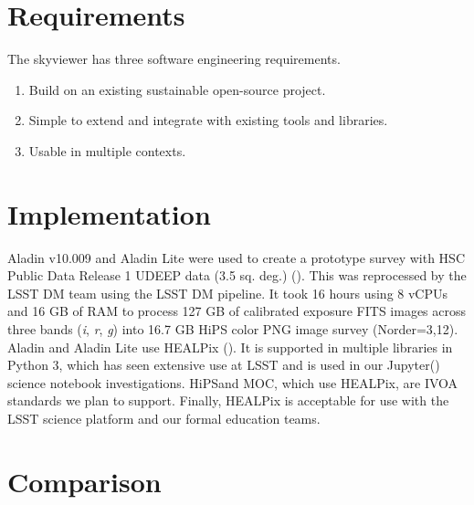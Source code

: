 \documentclass[11pt,twoside]{article}
\begin{document}

\section{Requirements}
The skyviewer has three software engineering requirements.
\begin{enumerate}
\item Build on an existing sustainable open-source project.
\item Simple to extend and integrate with existing tools and libraries.
\item Usable in multiple contexts.
\end{enumerate}

\section{Implementation}
Aladin v10.009 and Aladin Lite were used to create a prototype survey with HSC Public Data Release 1 UDEEP data (3.5 sq. deg.) (\citet{2017arXiv170208449A}). This was reprocessed by the LSST DM team using the LSST DM pipeline. It took 16 hours using 8 vCPUs and 16 GB of RAM to process 127 GB of calibrated exposure FITS images across three bands (\emph{i}, \emph{r}, \emph{g}) into 16.7 GB HiPS color PNG image survey (Norder=3,12).
Aladin and Aladin Lite use HEALPix (\citet{2007MNRAS.381..865C}). It is supported in multiple libraries in Python 3, which has seen extensive use at LSST and is used in our Jupyter\footnotemark[2] (\citet{PER-GRA:2007}) science notebook investigations. HiPS\footnotemark[3] and MOC\footnotemark[4], which use HEALPix, are IVOA standards we plan to support. Finally, HEALPix is acceptable for use with the LSST science platform and our formal education teams.


\section{Comparison}
\end{document}
